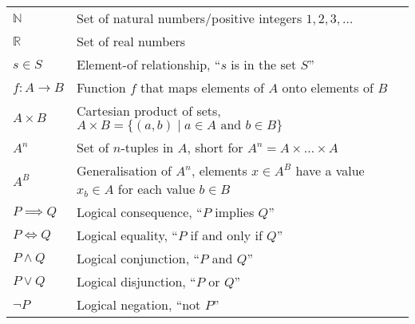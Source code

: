 
\begin{tabular}{ll}
$\mathbb N$ & Set of natural numbers/positive integers $1,2,3,\dots$\\
$\mathbb R$ & Set of real numbers\\[1em]
$s\in S$    & Element-of relationship, ``$s$ is in the set $S$''\\
$f:A\rightarrow B$ & Function $f$ that maps elements of $A$ onto elements of $B$\\
$A\times B$ & Cartesian product of sets, $A\times B=\{(a,b)\mid a\in A\text{ and }b\in B\}$\\
$A^n$           & Set of $n$-tuples in $A$, short for $A^n=A\times\dots\times A$\\
$A^B$     & Generalisation of $A^n$, elements $x\in A^B$ have a value $x_b\in A$ for each value $b\in B$\\[1em]
$P\implies Q$ & Logical consequence, ``$P$ implies $Q$''\\
$P\iff Q$     & Logical equality, ``$P$ if and only if $Q$''\\
$P\mathrel\land Q$ & Logical conjunction, ``$P$ and $Q$''\\
$P\mathrel\lor Q$ & Logical disjunction, ``$P$ or $Q$''\\
$\neg P$          & Logical negation, ``not $P$''
\end{tabular}